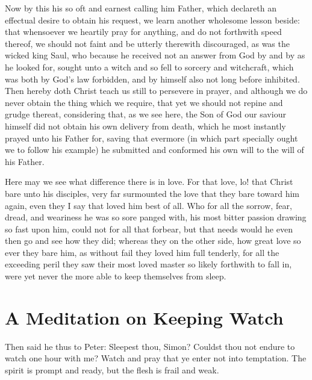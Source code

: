 \documentclass[a5paper]{scrbook}
\begin{document}
	Now by this his so oft and earnest calling him Father, which declareth an effectual desire to obtain his request, we learn another wholesome lesson beside: that whensoever we heartily pray for anything, and do not forthwith speed thereof, we should not faint and be utterly therewith discouraged, as was the wicked king Saul, who because he received not an answer from God by and by as he looked for, sought unto a witch and so fell to sorcery and witchcraft, which was both by God's law forbidden, and by himself also not long before inhibited. Then hereby doth Christ teach us still to persevere in prayer, and although we do never obtain the thing which we require, that yet we should not repine and grudge thereat, considering that, as we see here, the Son of God our saviour himself did not obtain his own delivery from death, which he most instantly prayed unto his Father for, saving that evermore (in which part specially ought we to follow his example) he submitted and conformed his own will to the will of his Father.
	
	 Here may we see what difference there is in love. For that love, lo! that Christ bare unto his disciples, very far surmounted the love that they bare toward him again, even they I say that loved him best of all. Who for all the sorrow, fear, dread, and weariness he was so sore panged with, his most bitter passion drawing so fast upon him, could not for all that forbear, but that needs would he even then go and see how they did; whereas they on the other side, how great love so ever they bare him, as without fail they loved him full tenderly, for all the exceeding peril they saw their most loved master so likely forthwith to fall in, were yet never the more able to keep themselves from sleep.
	
	
	\chapter{A Meditation on Keeping Watch}

	\begin{scripture}[Mt 26:40-41, Mk 14:37-38]
		Then said he thus to Peter: Sleepest thou, Simon? Couldst thou not endure to watch one hour with me? Watch and pray that ye enter not into temptation. The spirit is prompt and ready, but the flesh is frail and weak.
	\end{scripture}
	
	\vspace{10mm}
	
\end{document}
